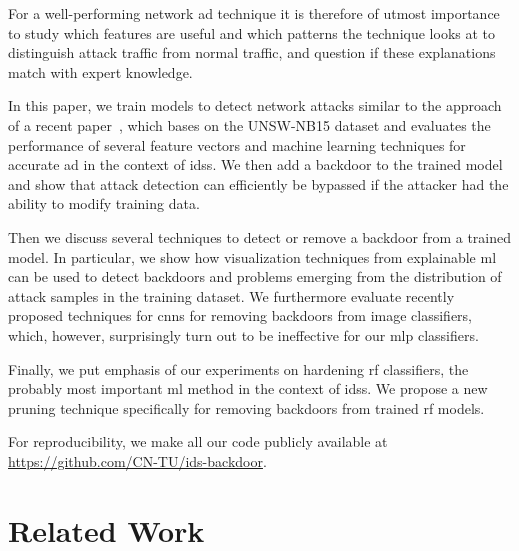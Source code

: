 \documentclass[10pt,sigconf,letterpaper,dvipsnames]{acmart}
\newcommand{\unsw}{UNSW-NB15}
\begin{document}
For a well-performing network \gls{ad} technique it is therefore of utmost importance to study which features are useful and which patterns the technique looks at to distinguish attack traffic from normal traffic, and question if these explanations match with expert knowledge.

In this paper, we train models to detect network attacks similar to the approach of a recent paper~\cite{meghdouri_analysis_2018}, which bases on the \unsw{} dataset \cite{moustafa_unsw-nb15:_2015} and evaluates the performance of several feature vectors and machine learning techniques for accurate \gls{ad} in the context of \glspl{ids}.
We then add a backdoor to the trained model and show that attack detection can efficiently be bypassed if the attacker had the ability to modify training data.

Then we discuss several techniques to detect or remove a backdoor from a trained model. In particular, we show how visualization techniques from explainable \gls{ml} can be used to detect backdoors and problems emerging from the distribution of attack samples in the training dataset.
We furthermore evaluate recently proposed techniques for \glspl{cnn} for removing backdoors from image classifiers, which, however, surprisingly turn out to be ineffective for our \gls{mlp} classifiers.


Finally, we put emphasis of our experiments on hardening \gls{rf} classifiers, the probably most important \gls{ml} method in the context of \glspl{ids}.
We propose a new pruning technique specifically for removing backdoors from trained \gls{rf} models.

For reproducibility, we make all our code publicly available at \url{https://github.com/CN-TU/ids-backdoor}.

\section{Related Work}
\end{document}
